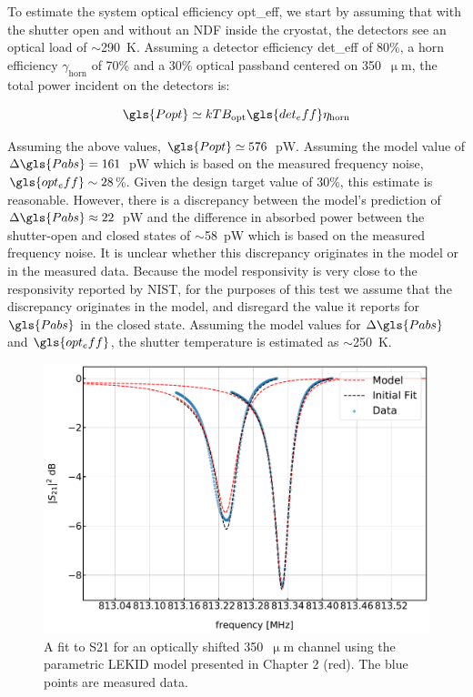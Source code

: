 To estimate the system optical efficiency \gls{opt_eff}, we start by assuming that with the shutter open and without an NDF inside the cryostat, the detectors see an optical load of $\sim$290~K. Assuming a detector efficiency \gls{det_eff} of 80\%, a horn efficiency $\gamma_{\mathrm{horn}}$ of 70\% and a 30\% optical passband centered on 350~$\upmu$m, the total power incident on the detectors is:

\begin{equation}\label{eq:opt eff}
  \gls{Popt} \simeq k T B_{\mathrm{opt}} \gls{det_eff} \eta_{\mathrm{horn}}
\end{equation}

Assuming the above values, $\gls{Popt} \simeq 576$~pW. Assuming the model value of $\Delta \gls{Pabs} = 161$~pW which is based on the measured frequency noise, $\gls{opt_eff} \sim 28$\%. Given the design target value of 30\%, this estimate is reasonable. However, there is a discrepancy between the model's prediction of $\Delta \gls{Pabs}\approx 22$~pW and the difference in absorbed power between the shutter-open and closed states of $\sim$58~pW which is based on the measured frequency noise. It is unclear whether this discrepancy originates in the model or in the measured data. Because the model responsivity is very close to the responsivity reported by NIST, for the purposes of this test we assume that the discrepancy originates in the model, and disregard the value it reports for $\gls{Pabs}$ in the closed state. Assuming the model values for $\Delta \gls{Pabs}$ and $\gls{opt_eff}$, the shutter temperature is estimated as $\sim$250~K.

\begin{figure}[!htbp]
\centering
\includegraphics[width=\textwidth]{figures/blast_data/sweeps/350_S21model_ice_final}
\caption[~A parametric fit of  for an optically shifted 350~ channel.]{A fit to \gls{S21} for an optically shifted 350~$\upmu$m channel using the parametric LEKID model presented in Chapter 2 (red). The blue points are measured data.}
\label{fig:350 S21 model}
\end{figure}

